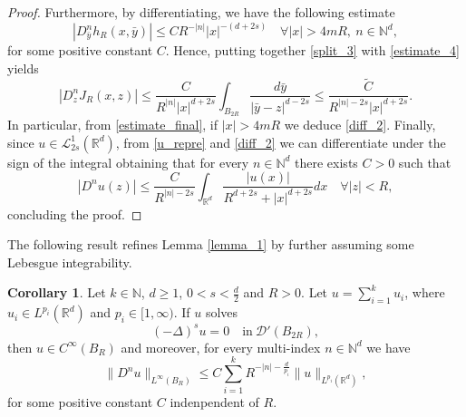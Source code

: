 \documentclass[letterpaper, 11pt,  reqno]{amsart}
\theoremstyle{definition}
\newtheorem{corollary}{Corollary}[section]
\theoremstyle{remark}
\numberwithin{equation}{section}
\newcommand{\N}{{\mathbb N}}
\newcommand{\R}{{\mathbb R}}
\begin{document}
\begin{proof}
		Furthermore, by differentiating, we have the following estimate
		\begin{equation}\label{estimate_4}
			|D^n_{\bar{y}}h_{R}(x,\bar{y})|\le CR^{-|n|}|x|^{-(d+2s)} \quad \forall |x|>4mR,\ n\in \N^d,
		\end{equation}
		for some positive constant $C$. Hence, putting together \eqref{split_3} with \eqref{estimate_4} yields
		\begin{equation}\label{estimate_final}
			|D^{n}_z J_R(x,z)|\le \frac{C}{R^{|n|}|x|^{d+2s}}\int_{B_{2R}}\frac{d\bar{y}}{|\bar{y}-z|^{d-2s}}\le \frac{\tilde{C}}{R^{|n|-2s}|x|^{d+2s}}.
		\end{equation}
		In particular, from \eqref{estimate_final}, if $|x|>4mR$ we deduce \eqref{diff_2}. Finally, since $u\in \mathscr{L}^{1}_{2s}(\R^d)$,  from \eqref{u_repre} and \eqref{diff_2} we can differentiate under the sign of the integral obtaining that for every $n\in \N^{d}$ there exists $C>0$ such that
		\begin{equation*}
			|D^{n} u(z)|\le \frac{C
			}{R^{|n|-2s}}\int_{\R^d}\frac{|u(x)|}{R^{d+2s}+|x|^{d+2s}}dx\quad \forall |z|<R,
		\end{equation*}
		concluding the proof.
	\end{proof}
The following result  refines Lemma \ref{lemma_1} by further assuming some Lebesgue integrability.
	\begin{corollary}\label{l_p}
		Let $k\in \N$, $d\ge 1$, $0<s<\frac{d}{2}$ and $R>0$. Let $u=\sum^{k}_{i=1} u_i$, where $u_i\in L^{p_i}(\R^d)$ and $p_i\in [1,\infty)$. If $u$ solves 
		\begin{equation*}\label{eq_0}
			(-\Delta)^{s}u=0\quad \text{in}\ \mathscr{D}'(B_{2R}),
		\end{equation*}
		then $u\in C^{\infty}({B_R})$ and moreover, for every multi-index $n\in \N^{d}$ we have
		\begin{equation}\label{ineq8boh}
			\|D^{n}u\|_{L^{\infty}({B_R})}\le C\sum^{k}_{i=1}R^{-|n|-\frac{d}{p_i}}\|u\|_{L^{p_i}(\R^d)},
		\end{equation}
		for some positive constant $C$ indenpendent of $R$.
	\end{corollary}
\end{document}
